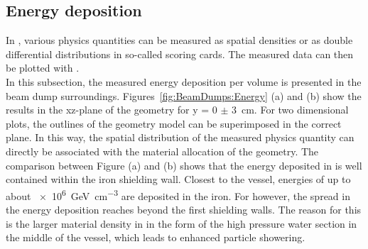 \subsection{Energy deposition}
\label{BeamDumps:sim_surrounding:Energy}
In \fluka, various physics quantities can be measured as spatial densities or as double differential distributions in so-called scoring cards.
The measured data can then be plotted with \flair.
\\In this subsection, the measured energy deposition per volume is presented in the beam dump surroundings.
Figures~\ref{fig:BeamDumps:Energy} (a) and (b) show the results in the xz-plane of the geometry for y = 0 $\pm$ \SI{3}{\centi\meter}.
For two dimensional plots, the outlines of the geometry model can be superimposed in the correct plane.
In this way, the spatial distribution of the measured physics quantity can directly be associated with the material allocation of the geometry.
The comparison between Figure (a) and (b) shows that the energy deposited in \designone is well contained within the iron shielding wall.
Closest to the vessel, energies of up to about \SI{e6}{\GeV\per\centi\meter\cubed} are deposited in the iron.
For \designtwo however, the spread in the energy deposition reaches beyond the first shielding walls.
The reason for this is the larger material density in \designtwo in the form of the high pressure water section in the middle of the vessel, which leads to enhanced particle showering.
